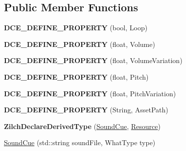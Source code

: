 \subsection*{Public Member Functions}
\begin{DoxyCompactItemize}
\item 
\hypertarget{classDCEngine_1_1SoundCue_ad3827ddbc52099513095099d4a26cb50}{{\bfseries D\-C\-E\-\_\-\-D\-E\-F\-I\-N\-E\-\_\-\-P\-R\-O\-P\-E\-R\-T\-Y} (bool, Loop)}\label{classDCEngine_1_1SoundCue_ad3827ddbc52099513095099d4a26cb50}

\item 
\hypertarget{classDCEngine_1_1SoundCue_a0f30316da5d29359fecf41e1746bba6c}{{\bfseries D\-C\-E\-\_\-\-D\-E\-F\-I\-N\-E\-\_\-\-P\-R\-O\-P\-E\-R\-T\-Y} (float, Volume)}\label{classDCEngine_1_1SoundCue_a0f30316da5d29359fecf41e1746bba6c}

\item 
\hypertarget{classDCEngine_1_1SoundCue_a662bb7255207e22dc060689885dfa0b0}{{\bfseries D\-C\-E\-\_\-\-D\-E\-F\-I\-N\-E\-\_\-\-P\-R\-O\-P\-E\-R\-T\-Y} (float, Volume\-Variation)}\label{classDCEngine_1_1SoundCue_a662bb7255207e22dc060689885dfa0b0}

\item 
\hypertarget{classDCEngine_1_1SoundCue_a3cf42a5d9c1f0f9a07d148e28225fe0e}{{\bfseries D\-C\-E\-\_\-\-D\-E\-F\-I\-N\-E\-\_\-\-P\-R\-O\-P\-E\-R\-T\-Y} (float, Pitch)}\label{classDCEngine_1_1SoundCue_a3cf42a5d9c1f0f9a07d148e28225fe0e}

\item 
\hypertarget{classDCEngine_1_1SoundCue_a27334c6703be5ef2b21744c386b687d2}{{\bfseries D\-C\-E\-\_\-\-D\-E\-F\-I\-N\-E\-\_\-\-P\-R\-O\-P\-E\-R\-T\-Y} (float, Pitch\-Variation)}\label{classDCEngine_1_1SoundCue_a27334c6703be5ef2b21744c386b687d2}

\item 
\hypertarget{classDCEngine_1_1SoundCue_a92fd920e5d4706f8185c2e0b756d50de}{{\bfseries D\-C\-E\-\_\-\-D\-E\-F\-I\-N\-E\-\_\-\-P\-R\-O\-P\-E\-R\-T\-Y} (String, Asset\-Path)}\label{classDCEngine_1_1SoundCue_a92fd920e5d4706f8185c2e0b756d50de}

\item 
\hypertarget{classDCEngine_1_1SoundCue_af49a90ecc83622a32bd2f84927f9f150}{{\bfseries Zilch\-Declare\-Derived\-Type} (\hyperlink{classDCEngine_1_1SoundCue}{Sound\-Cue}, \hyperlink{classDCEngine_1_1Resource}{Resource})}\label{classDCEngine_1_1SoundCue_af49a90ecc83622a32bd2f84927f9f150}

\item 
\hypertarget{classDCEngine_1_1SoundCue_a56e5b51227528be7eea916cf75f19f93}{\hyperlink{classDCEngine_1_1SoundCue_a56e5b51227528be7eea916cf75f19f93}{Sound\-Cue} (std\-::string sound\-File, What\-Type type)}\label{classDCEngine_1_1SoundCue_a56e5b51227528be7eea916cf75f19f93}


\end{DoxyCompactItemize}
